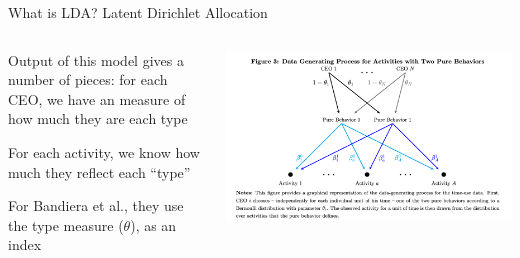 \documentclass[notes,11pt, aspectratio=169]{beamer}
\newenvironment{wideitemize}{\itemize\addtolength{\itemsep}{10pt}}{\enditemize}
\begin{document}
  \begin{frame}{What is LDA? Latent Dirichlet Allocation}
    \begin{columns}[onlytextwidth, T] %
      \begin{column}{.5\textwidth}
        \begin{wideitemize}
        \item Output of this model gives a number of pieces: for each
          CEO, we have an measure of how much they are each type
        \item For each activity, we know how much they reflect each
          ``type''
        \item For Bandiera et al., they use the type measure
          ($\theta$), as an index
        \end{wideitemize}
      \end{column}%
      \hfill%
      \begin{column}{.5\textwidth}
        \includegraphics[width=\linewidth]{images/bandiera_2.png}
      \end{column}%
    \end{columns}
  \end{frame}
\end{document}
